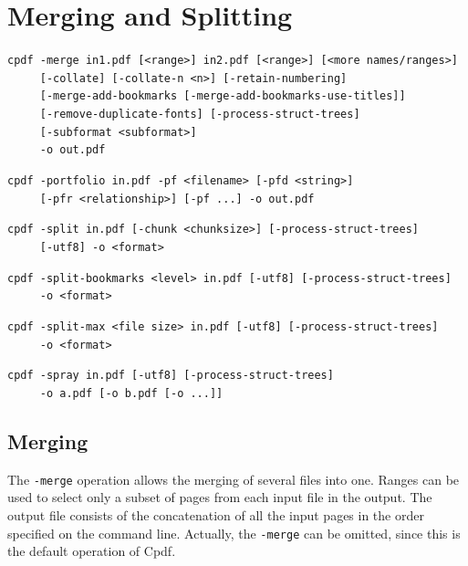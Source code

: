 \documentclass{book}
\begin{document}
\chapter{Merging and Splitting}\label{chap:2}
  \pagestyle{fancy}
  \begin{framed}
  \small
  \noindent\verb!cpdf -merge in1.pdf [<range>] in2.pdf [<range>] [<more names/ranges>]!\\
  \noindent\verb!     [-collate] [-collate-n <n>] [-retain-numbering]!\\
  \noindent\verb!     [-merge-add-bookmarks [-merge-add-bookmarks-use-titles]]!\\
  \noindent\verb!     [-remove-duplicate-fonts] [-process-struct-trees]!\\
  \noindent\verb!     [-subformat <subformat>]!\\
  \noindent\verb!     -o out.pdf!

  \vspace{1.5mm}
  \noindent\verb!cpdf -portfolio in.pdf -pf <filename> [-pfd <string>]!\\
  \noindent\verb!     [-pfr <relationship>] [-pf ...] -o out.pdf!

  \vspace{1.5mm}
  \noindent\verb!cpdf -split in.pdf [-chunk <chunksize>] [-process-struct-trees]!\\
  \noindent\verb!     [-utf8] -o <format>!

  \vspace{1.5mm}
  \noindent\verb!cpdf -split-bookmarks <level> in.pdf [-utf8] [-process-struct-trees]!\\
  \noindent\verb!     -o <format>!

  \vspace{1.5mm}
  \noindent\verb!cpdf -split-max <file size> in.pdf [-utf8] [-process-struct-trees]!\\
  \noindent\verb!     -o <format>!

  \vspace{1.5mm}
  \noindent\verb!cpdf -spray in.pdf [-utf8] [-process-struct-trees]!\\
  \noindent\verb!     -o a.pdf [-o b.pdf [-o ...]]!
  \end{framed}

  \vspace{12mm}

  \section{Merging}
  The \texttt{-merge} operation allows the merging of several files into one.
Ranges can be used to select only a subset of pages from each
input file in the output. The output file consists of the concatenation of all
the input pages in the order specified on the command line. Actually, the
\texttt{-merge} can be omitted, since this is the default operation of Cpdf.
\end{document}
